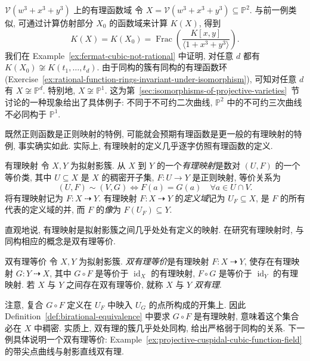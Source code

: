 \begin{Example}{$\mathcal{V}(w^{3}+x^{3}+y^{3})$ 上的有理函数域}\leavevmode\label{ex:irreducible-projective-cubic-not-isomorphic-to-line}
令 $X=\mathcal{V}(w^{3}+x^{3}+y^{3})\subseteq\mathbb{P}^{2}$. 与前一例类似, 可通过计算仿射部分 $X_{0}$ 的函数域来计算 $K(X)$, 得到
\[
  K(X)=K(X_{0})=\operatorname{Frac}\left(\frac{K[x,y]}{\langle1+x^{3}+y^{3}\rangle}\right).
\]
我们在 Example~\ref{ex:fermat-cubic-not-rational} 中证明, 对任意 $d$ 都有 $K(X_{0})\not\cong K(t_{1},\ldots,t_{d})$. 由于同构的簇有同构的有理函数环 (Exercise~\ref{ex:rational-function-rings-invariant-under-isomorphism}), 可知对任意 $d$ 有 $X\not\cong\mathbb{P}^{d}$. 特别地, $X\not\cong\mathbb{P}^{1}$. 这为第~\ref{sec:isomorphisms-of-projective-varieties}~节讨论的一种现象给出了具体例子: 不同于不可约二次曲线, $\mathbb{P}^{2}$ 中的不可约三次曲线不必同构于 $\mathbb{P}^{1}$.
\end{Example}

既然正则函数是正则映射的特例, 可能就会预期有理函数是更一般的有理映射的特例, 事实确实如此. 实际上, 有理映射的定义几乎逐字仿照有理函数的定义.

\begin{Definition}{有理映射}\leavevmode\label{def:rational-map-of-quasiprojective-varieties}
令 $X,Y$ 为拟射影簇. 从 $X$ 到 $Y$ 的一个\emph{有理映射}是数对 $(U,F)$ 的一个等价类, 其中 $U\subseteq X$ 是 $X$ 的稠密开子集, $F:U\to Y$ 是正则映射, 等价关系为
\[
  (U,F)\sim(V,G)\iff F(a)=G(a)\quad\forall a\in U\cap V.
\]
将有理映射记为 $F:X\mathrel{\rightdasharrow} Y$. 有理映射 $F:X\mathrel{\rightdasharrow} Y$ 的\emph{定义域}记为 $U_{F}\subseteq X$, 是 $F$ 的所有代表的定义域的并, 而 $F$ 的\emph{像}为 $F(U_{F})\subseteq Y$.
\end{Definition}

直观地说, 有理映射是拟射影簇之间\textquotedbl{}几乎处处\textquotedbl{}有定义的映射. 在研究有理映射时, 与\textquotedbl{}同构\textquotedbl{}相应的概念是双有理等价.

\begin{Definition}{双有理等价}\leavevmode\label{def:birational-equivalence}
令 $X,Y$ 为拟射影簇. \emph{双有理等价}是有理映射 $F:X\mathrel{\rightdasharrow} Y$, 使存在有理映射 $G:Y\mathrel{\rightdasharrow} X$, 其中 $G\circ F$ 是等价于 $\operatorname{id}_{X}$ 的有理映射, $F\circ G$ 是等价于 $\operatorname{id}_{Y}$ 的有理映射. 若 $X$ 与 $Y$ 之间存在双有理等价, 就称 $X$ 与 $Y$ \emph{双有理}.
\end{Definition}

注意, 复合 $G\circ F$ 定义在 $U_{F}$ 中映入 $U_{G}$ 的点所构成的开集上. 因此 Definition~\ref{def:birational-equivalence} 中要求 $G\circ F$ 是有理映射, 意味着这个集合必在 $X$ 中稠密. 实质上, 双有理的簇\textquotedbl{}几乎处处\textquotedbl{}同构, 给出严格弱于同构的关系. 下一例具体说明一个双有理等价: Example~\ref{ex:projective-cuspidal-cubic-function-field} 的带尖点曲线与射影直线双有理.

